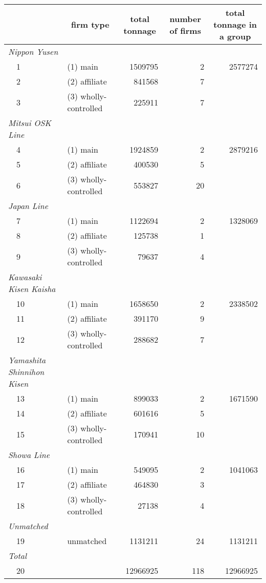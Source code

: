 \begin{tabular}{llrrr}
\toprule
\multicolumn{1}{l}{}&\multicolumn{1}{c}{firm type}&\multicolumn{1}{c}{total tonnage}&\multicolumn{1}{c}{number of firms}&\multicolumn{1}{c}{total tonnage in a group}\tabularnewline
\midrule
{\itshape Nippon Yusen}&&&&\tabularnewline
~~1&(1) main&1509795&2&2577274\tabularnewline
~~2&(2) affiliate&841568&7&\tabularnewline
~~3&(3) wholly-controlled&225911&7&\tabularnewline
\midrule
{\itshape Mitsui OSK Line}&&&&\tabularnewline
~~4&(1) main&1924859&2&2879216\tabularnewline
~~5&(2) affiliate&400530&5&\tabularnewline
~~6&(3) wholly-controlled&553827&20&\tabularnewline
\midrule
{\itshape Japan Line}&&&&\tabularnewline
~~7&(1) main&1122694&2&1328069\tabularnewline
~~8&(2) affiliate&125738&1&\tabularnewline
~~9&(3) wholly-controlled&79637&4&\tabularnewline
\midrule
{\itshape Kawasaki Kisen Kaisha}&&&&\tabularnewline
~~10&(1) main&1658650&2&2338502\tabularnewline
~~11&(2) affiliate&391170&9&\tabularnewline
~~12&(3) wholly-controlled&288682&7&\tabularnewline
\midrule
{\itshape Yamashita Shinnihon Kisen}&&&&\tabularnewline
~~13&(1) main&899033&2&1671590\tabularnewline
~~14&(2) affiliate&601616&5&\tabularnewline
~~15&(3) wholly-controlled&170941&10&\tabularnewline
\midrule
{\itshape Showa Line}&&&&\tabularnewline
~~16&(1) main&549095&2&1041063\tabularnewline
~~17&(2) affiliate&464830&3&\tabularnewline
~~18&(3) wholly-controlled&27138&4&\tabularnewline
\midrule
{\itshape Unmatched}&&&&\tabularnewline
~~19&unmatched&1131211&24&1131211\tabularnewline
\midrule
{\itshape Total}&&&&\tabularnewline
~~20&&12966925&118&12966925\tabularnewline
\bottomrule
\end{tabular}
